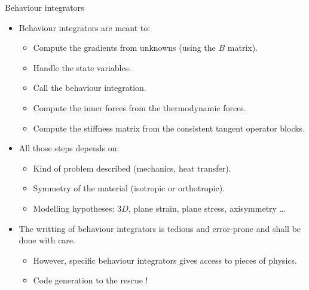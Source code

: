 \documentclass{beamer}
\begin{document}
\begin{frame}{Behaviour
    integrators}
  \begin{itemize}
    \item Behaviour integrators are meant to:
    \begin{itemize}
      \item Compute the gradients from unknowns (using the
      \(B\) matrix).
      \item Handle the state variables.
      \item Call the behaviour integration.
      \item Compute the inner forces from the thermodynamic
      forces.
      \item Compute the stiffness matrix from the consistent
      tangent operator blocks.
    \end{itemize}
  \end{itemize}
  \begin{itemize}
    \item All those steps depends on:
    \begin{itemize}
      \item Kind of problem described (mechanics, heat
      transfer).
      \item Symmetry of the material (isotropic or
      orthotropic).
      \item Modelling hypotheses: \(3D\), plane strain,
      plane stress, axisymmetry \ldots
    \end{itemize}
  \end{itemize}
  \begin{itemize}
    \item The writting of behaviour integrators is tedious and
    error-prone and shall be done with care.
    \begin{itemize}
      \item However, specific behaviour integrators gives
      access to pieces of physics.
      \item Code generation to the rescue !
    \end{itemize}
  \end{itemize}
\end{frame}
\end{document}
